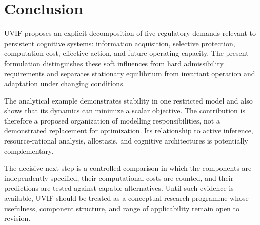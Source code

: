 \section{Conclusion}
\label{sec:conclusion}

UVIF proposes an explicit decomposition of five regulatory demands relevant to persistent cognitive systems: information acquisition, selective protection, computation cost, effective action, and future operating capacity. The present formulation distinguishes these soft influences from hard admissibility requirements and separates stationary equilibrium from invariant operation and adaptation under changing conditions.

The analytical example demonstrates stability in one restricted model and also shows that its dynamics can minimize a scalar objective. The contribution is therefore a proposed organization of modelling responsibilities, not a demonstrated replacement for optimization. Its relationship to active inference, resource-rational analysis, allostasis, and cognitive architectures is potentially complementary.

The decisive next step is a controlled comparison in which the components are independently specified, their computational costs are counted, and their predictions are tested against capable alternatives. Until such evidence is available, UVIF should be treated as a conceptual research programme whose usefulness, component structure, and range of applicability remain open to revision.
